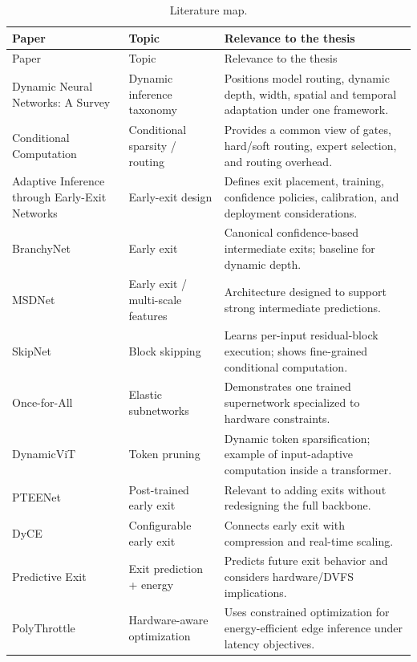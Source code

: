 \documentclass[11pt,a4paper]{article}
\begin{document}
\begin{longtable}{@{}p{}p{}p{}@{}}
\caption{Literature map.}\label{tab:literature-map}\\
\toprule
Paper & Topic & Relevance to the thesis \\
\midrule
\endfirsthead
\toprule
Paper & Topic & Relevance to the thesis \\
\midrule
\endhead
Dynamic Neural Networks: A Survey \cite{han2021dynamic} & Dynamic inference taxonomy & Positions model routing, dynamic depth, width, spatial and temporal adaptation under one framework. \\
Conditional Computation \cite{scardapane2024conditional} & Conditional sparsity / routing & Provides a common view of gates, hard/soft routing, expert selection, and routing overhead. \\
Adaptive Inference through Early-Exit Networks \cite{laskaridis2021} & Early-exit design & Defines exit placement, training, confidence policies, calibration, and deployment considerations. \\
BranchyNet \cite{branchynet} & Early exit & Canonical confidence-based intermediate exits; baseline for dynamic depth. \\
MSDNet \cite{msdnet} & Early exit / multi-scale features & Architecture designed to support strong intermediate predictions. \\
SkipNet \cite{skipnet} & Block skipping & Learns per-input residual-block execution; shows fine-grained conditional computation. \\
Once-for-All \cite{ofa} & Elastic subnetworks & Demonstrates one trained supernetwork specialized to hardware constraints. \\
DynamicViT \cite{dynamicvit} & Token pruning & Dynamic token sparsification; example of input-adaptive computation inside a transformer. \\
PTEENet \cite{pteenet} & Post-trained early exit & Relevant to adding exits without redesigning the full backbone. \\
DyCE \cite{dyce} & Configurable early exit & Connects early exit with compression and real-time scaling. \\
Predictive Exit \cite{predictiveexit} & Exit prediction + energy & Predicts future exit behavior and considers hardware/DVFS implications. \\
PolyThrottle \cite{polythrottle} & Hardware-aware optimization & Uses constrained optimization for energy-efficient edge inference under latency objectives. \\

\end{longtable}
\end{document}
